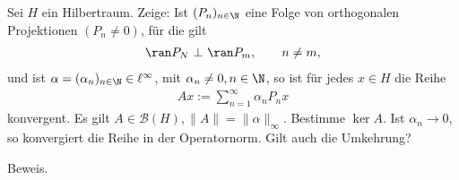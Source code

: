 \begin{exercise}
Sei $H$ ein Hilbertraum. Zeige: Ist $(P_n)_{n \in \N}$ eine Folge von orthogonalen
Projektionen $(P_n \neq 0)$, für die gilt
\begin{align*}
  \ran P_N ~\bot~ \ran P_m, \qquad n \neq m,
\end{align*}
und ist $\alpha = (\alpha_n)_{n \in \N} \in \ell^{\infty}$, mit $\alpha_n \neq 0, n \in \N$,
so ist für jedes $x \in H$ die Reihe
\begin{align*}
  Ax := \sum_{n=1}^{\infty} \alpha_n P_n x
\end{align*}
konvergent. Es gilt $A \in \mathcal{B}(H), \|A\| = \|\alpha\|_{\infty}$. Bestimme
$\ker A$. Ist $\alpha_n \to 0$, so konvergiert die Reihe in der Operatornorm.
Gilt auch die Umkehrung?
\end{exercise}
\begin{solution}
Beweis.
\end{solution}
